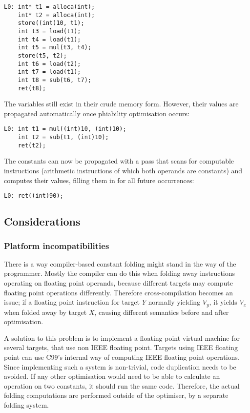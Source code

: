 \documentclass[12pt, a4paper]{article}
\begin{document}
\begin{lstlisting}
L0:	int* t1 = alloca(int);
	int* t2 = alloca(int);
	store((int)10, t1);
	int t3 = load(t1);
	int t4 = load(t1);
	int t5 = mul(t3, t4);
	store(t5, t2);
	int t6 = load(t2);
	int t7 = load(t1);
	int t8 = sub(t6, t7);
	ret(t8);
\end{lstlisting}

The variables still exist in their crude memory form. However, their values are 
propagated automatically once phiability optimisation occurs:

\begin{lstlisting}
L0:	int t1 = mul((int)10, (int)10);
	int t2 = sub(t1, (int)10);
	ret(t2);
\end{lstlisting}

The constants can now be propagated with a pass that scans for computable 
instructions (arithmetic instructions of which both operands are constants) and 
computes their values, filling them in for all future occurrences:

\begin{lstlisting}
L0:	ret((int)90);
\end{lstlisting}

\subsection{Considerations}
\subsubsection{Platform incompatibilities}
There is a way compiler-based constant folding might stand in the way of the 
programmer. Mostly the compiler can do this when folding
away instructions  operating on floating point operands, because different targets may compute 
floating point operations differently. Therefore cross-compilation becomes an 
issue; if a floating point instruction for target $Y$ normally yielding $V_y$, it 
yields $V_x$ when folded away by target $X$, causing different semantics before and 
after optimisation.\cite{cfld_cross}

A solution to this problem is to implement a floating point virtual machine for 
several targets, that use non IEEE floating point. Targets using IEEE floating 
point can use C99's internal way of computing IEEE floating point operations.
Since implementing such a system is non-trivial, code duplication needs to be 
avoided. If any other optimisation would need to be able to calculate an 
operation on two constants, it should run the same code. Therefore, the actual 
folding computations are performed outside of the optimiser, by a separate 
folding system.
\end{document}
